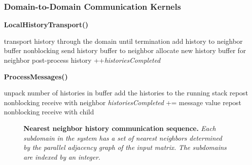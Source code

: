\clearpage

\subsubsection{Domain-to-Domain Communication Kernels}
\label{subsubsec:domain_to_domain_kernel}

\begin{algorithm}[h!]
  \caption{\textbf{LocalHistoryTransport()}}
  \label{alg:local_history_transport}
  \begin{algorithmic}[1]
    \State transport history through the domain until termination
    \State add history to neighbor buffer
    \State nonblocking send history buffer to neighbor
    \State allocate new history buffer for neighbor
    \EndIf
    \Else
    \State post-process history
    \State ++\textit{historiesCompleted}
    \EndIf
    \EndIf
  \end{algorithmic}
\end{algorithm}

\begin{algorithm}[h!]
  \caption{\textbf{ProcessMessages()}}
  \label{alg:process_messages}
  \begin{algorithmic}[1]
    \State unpack number of histories in buffer
    \State add the histories to the running stack
    \State repost nonblocking receive with neighbor
    \EndFor
    \State \textit{historiesCompleted} += message value
    \State repost nonblocking receive with child
    \EndFor
  \end{algorithmic}
\end{algorithm}

\begin{figure}[htpb!]
  \begin{center}
    \scalebox{1.5}{  }
  \end{center}
  \caption{\textbf{Nearest neighbor history communication sequence.}
    \textit{Each subdomain in the system has a set of nearest
      neighbors determined by the parallel adjacency graph of the
      input matrix. The subdomains are indexed by an integer.}}
  \label{fig:nearest_neighbor_comm}
\end{figure}

\clearpage

